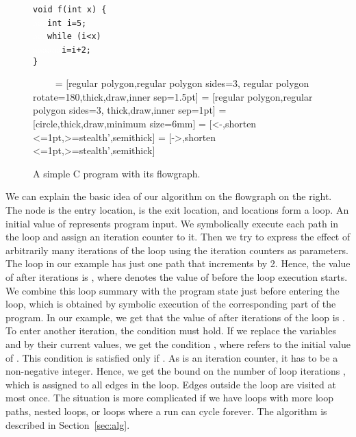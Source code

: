 \documentclass[10pt,a4paper]{article}
\begin{document}
\begin{figure}[t] \centering
\begin{minipage}[b]{0.4\linewidth}
  \texttt{void f(int x) \{}\\
  \textcolor{white}{aaa}\texttt{int i=5;}\\
  \textcolor{white}{aaa}\texttt{while (i<x)}\\
  \textcolor{white}{aaaaaa}\texttt{i=i+2;}\\\texttt{\}}
\end{minipage}
~~~~
 = [regular polygon,regular polygon sides=3, regular polygon rotate=180,thick,draw,inner sep=1.5pt]
 = [regular polygon,regular polygon sides=3, thick,draw,inner sep=1pt]
 = [circle,thick,draw,minimum size=6mm]
 = [<-,shorten <=1pt,>=stealth',semithick]
 = [->,shorten <=1pt,>=stealth',semithick]
\caption{A simple C program with its flowgraph.}
\label{fig:ex1} 
\end{figure}



We can explain the basic idea of our algorithm on the
flowgraph on the right. The node  is the entry location,  is the exit
location, and locations  form a loop. An initial value of
 represents program input. We symbolically execute each path
in the loop and assign an iteration counter to it. Then we try to
express the effect of arbitrarily many iterations of the loop using
the iteration counters as parameters. The loop in our example has just
one path  that increments  by 2. Hence, the value of
 after  iterations is , where
 denotes the value of  before the loop execution
starts. We combine this loop summary with the program state just
before entering the loop, which is obtained by symbolic execution of
the corresponding part of the program. In our example, we get that the
value of  after  iterations of the loop is
. To enter another iteration, the condition 
must hold. If we replace the variables  and  by
their current values, we get the condition , where
 refers to the initial value of . This condition is
satisfied only if . As  is an
iteration counter, it has to be a non-negative integer. Hence, we get
the bound on the number of loop iterations
, which is assigned to
all edges in the loop. Edges outside the loop are visited at most
once. The situation is more complicated if we have loops with more
loop paths, nested loops, or loops where a run can cycle forever. The
algorithm is described in Section~\ref{sec:alg}. 
\end{document}
